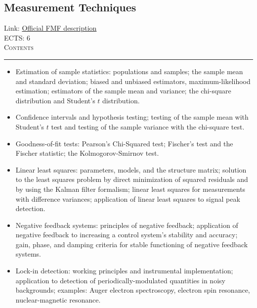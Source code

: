 \documentclass[11pt, a4paper]{article}
\newenvironment{course}[3]{
\subsection{#1}%
Link: \href{#2}{Official FMF description}\\%
ECTS: #3%
\vspace{1ex}
\\
{\large \textsc{Contents}}\\[-0.9ex]%
\rule{\textwidth}{0.5pt}
\vspace{-3ex}
}
{}
\newenvironment{chapter}[1]{
\begin{tcolorbox}[title=#1, breakable]
}
{\end{tcolorbox}}
\begin{document}
\begin{course}{Measurement Techniques}{https://www.fmf.uni-lj.si/en/study-physics/programmes/1fiz/2020/7000777/courses/1441/}{6}
\begin{chapter}{Analysis of sensors and filters}
\begin{itemize}
        \end{itemize}
    \end{chapter}

    \begin{chapter}{Statistics}
        \begin{itemize}
        
            \item Estimation of sample statistics: populations and samples; the sample mean and standard deviation; biased and unbiased estimators, maximum-likelihood estimation; estimators of the sample mean and variance; the chi-square distribution and Student's $ t $ distribution.

            \item Confidence intervals and hypothesis testing; testing of the sample mean with Student's $ t $ test and testing of the sample variance with the chi-square test.

            \item Goodness-of-fit tests: Pearson's Chi-Squared test; Fischer's test and the Fischer statistic; the Kolmogorov-Smirnov test.

            \item Linear least squares: parameters, models, and the structure matrix; solution to the least squares problem by direct minimization of squared residuals and by using the Kalman filter formalism; linear least squares for measurements with difference variances; application of linear least squares to signal peak detection.
        
        \end{itemize}
    \end{chapter}

    \begin{chapter}{Important measurement techniques}
        \begin{itemize}
        
            \item Negative feedback systems: principles of negative feedback; application of negative feedback to increasing a control system's stability and accuracy; gain, phase, and damping criteria for stable functioning of negative feedback systems.

            \item Lock-in detection: working principles and instrumental implementation; application to detection of periodically-modulated quantities in noisy backgrounds; examples: Auger electron spectroscopy, electron spin resonance, nuclear-magnetic resonance.


\end{itemize}
\end{chapter}
\end{course}
\end{document}
